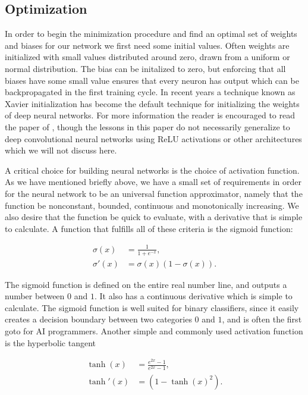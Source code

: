 \subsection{Optimization}\label{chap:optimization}
In order to begin the minimization procedure and find an optimal
set of weights and biases for our network we first need some initial values.
Often weights are initialized with small values distributed around zero,
drawn from a uniform or normal distribution. The bias can be initalized to zero,
but enforcing that all biases have some small value ensures that every
neuron has output which can be backpropagated in the first training cycle.
In recent years a technique known as Xavier initialization has become
the default technique for initializing the weights of deep neural networks.
For more information the reader is encouraged to read the paper of
\parencite[Glorot, Xavier and Bengio, Yoshua]{glorot2010understanding},
though the lessons
in this paper do not necessarily generalize to deep convolutional neural
networks using ReLU activations or other architectures which we will
not discuss here.
\par
A critical choice for building neural networks is the choice of activation function.
As we have mentioned briefly above, we have a small set of requirements in order
for the neural network to be an universal function approximator, namely
that the function be nonconstant, bounded, continuous and monotonically increasing.
We also desire that the function be quick to evaluate, with a derivative that
is simple to calculate.
A function that fulfills all of these criteria is the sigmoid function:

\begin{equation}
    \begin{split}
        \sigma(x) &= \frac{1}{1 + e^{-x}} , \\
        \sigma '(x) &= \sigma(x)(1 - \sigma(x)) .
    \end{split}
\end{equation}

The sigmoid function is defined on the entire real number line,
and outputs a number between $0$ and $1$. It also has a continuous derivative
which is simple to calculate. The sigmoid function is well suited for binary
classifiers, since it easily creates a decision boundary between two categories
$0$ and $1$, and is often the first goto for AI programmers.
Another simple and commonly used activation function is the hyperbolic tangent

\begin{equation}
    \begin{split}
        \tanh(x) &= \frac{e^{2x} -1}{e^{2x} - 1} , \\
        \tanh '(x) &= (1 - \tanh(x)^2) .
    \end{split}
\end{equation}

